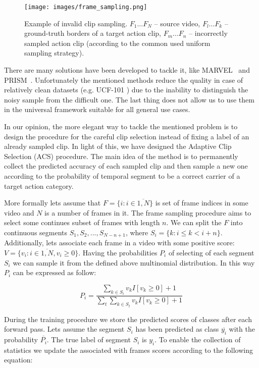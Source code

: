 \documentclass[twoside, twocolumn]{article}
\begin{document}
\begin{figure}[ht]
\centering
\texttt{[image: images/frame\_sampling.png]}
\caption{Example of invalid clip sampling. $F_1...F_N$ -- source video, $F_l...F_k$ -- ground-truth borders of a target
action clip, $F_m...F_n$ -- incorrectly sampled action clip (according to the common used uniform sampling strategy).}
\label{fig:frame_sampling}
\end{figure}

There are many solutions have been developed to tackle it, like MARVEL~\cite{MARVEL} and PRISM~\cite{PRISM}.
Unfortunately the mentioned methods reduce the quality in case of relatively clean datasets (e.g. UCF-101
\cite{UCF101}) due to the inability to distinguish the noisy sample from the difficult one. The last thing does not
allow us to use them in the universal framework suitable for all general use cases.

In our opinion, the more elegant way to tackle the mentioned problem is to design the procedure for the careful
clip selection instead of fixing a label of an already sampled clip. In light of this, we have designed the Adaptive
Clip Selection (ACS) procedure. The main idea of the method is to permanently collect the predicted accuracy of each
sampled clip and then sample a new one according to the probability of temporal segment to be a correct carrier of a
target action category.

More formally lets assume that $F=\{i: i \in \overline{1,N}\}$ is set of frame indices in some video and $N$ is a number
of frames in it. The frame sampling procedure aims to select some continues subset of frames with length $n$. We can
split the $F$ into continuous segments $S_1,S_2, ..., S_{N-n+1}$, where $S_i=\{k: i \leq k < i + n \}$. Additionally,
lets associate each frame in a video with some positive score: $V=\{v_i: i \in \overline{1,N}, v_i \geq 0\}$. Having the
probabilities $P_i$ of selecting of each segment $S_i$ we can sample it from the defined above multinomial distribution.
In this way $P_i$ can be expressed as follow:

\begin{equation}
\label{eq:segment_prob}
P_i=\frac{\sum_{k \in S_i} v_kI[v_k \geq 0] + 1}{\sum_t \sum_{k \in S_t} v_kI[v_k \geq 0] + 1}
\end{equation}

During the training procedure we store the predicted scores of classes after each forward pass. Lets assume the segment
$S_i$ has been predicted as class $\overline{y_i}$ with the probability $\overline{P_i}$. The true label of segment
$S_i$ is $y_i$. To enable the collection of statistics we update the associated with frames scores according to the
following equation:
\end{document}
